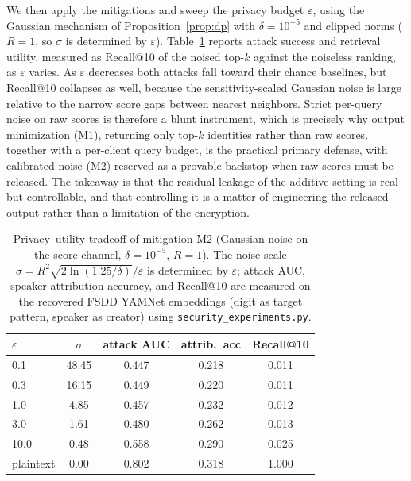 \documentclass[sigconf,nonacm]{acmart}
\begin{document}
We then apply the mitigations and sweep the privacy budget $\varepsilon$, using the Gaussian mechanism of Proposition~\ref{prop:dp} with $\delta{=}10^{-5}$ and clipped norms ($R{=}1$, so $\sigma$ is determined by $\varepsilon$). Table~\ref{tab:security} reports attack success and retrieval utility, measured as Recall@10 of the noised top-$k$ against the noiseless ranking, as $\varepsilon$ varies. As $\varepsilon$ decreases both attacks fall toward their chance baselines, but Recall@10 collapses as well, because the sensitivity-scaled Gaussian noise is large relative to the narrow score gaps between nearest neighbors. Strict per-query noise on raw scores is therefore a blunt instrument, which is precisely why output minimization (M1), returning only top-$k$ identities rather than raw scores, together with a per-client query budget, is the practical primary defense, with calibrated noise (M2) reserved as a provable backstop when raw scores must be released. The takeaway is that the residual leakage of the additive setting is real but controllable, and that controlling it is a matter of engineering the released output rather than a limitation of the encryption.

\begin{table}[t]
\centering\setlength{\tabcolsep}{5pt}
\begin{tabular}{lcccc}
\toprule
$\varepsilon$ & $\sigma$ & \textbf{attack AUC} & \textbf{attrib.\ acc} & \textbf{Recall@10} \\
\midrule
0.1  & 48.45 & 0.447 & 0.218 & 0.011 \\
0.3  & 16.15 & 0.449 & 0.220 & 0.011 \\
1.0  & 4.85  & 0.457 & 0.232 & 0.012 \\
3.0  & 1.61  & 0.480 & 0.262 & 0.013 \\
10.0 & 0.48  & 0.558 & 0.290 & 0.025 \\
plaintext & 0.00 & 0.802 & 0.318 & 1.000 \\
\bottomrule
\end{tabular}
\caption{Privacy--utility tradeoff of mitigation M2 (Gaussian noise on the score channel, $\delta{=}10^{-5}$, $R{=}1$). The noise scale $\sigma=R^2\sqrt{2\ln(1.25/\delta)}/\varepsilon$ is determined by $\varepsilon$; attack AUC, speaker-attribution accuracy, and Recall@10 are measured on the recovered FSDD YAMNet embeddings (digit as target pattern, speaker as creator) using \texttt{security\_experiments.py}.}
\label{tab:security}
\end{table}
\end{document}
